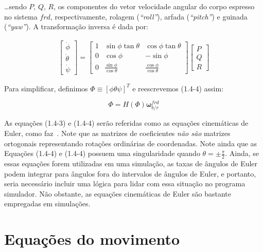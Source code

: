 \ldots sendo \(P\), \(Q\), \(R\), os componentes do vetor velocidade angular do corpo espresso no sistema \(frd\), respectivamente, rolagem (\emph{``roll''}), arfada (\emph{``pitch''}) e guinada (\emph{``yaw''}). A transformação inversa é dada por:

\begin{align} \tag{1.4-4}
    \begin{bmatrix}
        \dot\phi \\
        \dot\theta \\
        \dot\psi
    \end{bmatrix}
    =
    \begin{bmatrix}
        1 & \sin{\phi}\tan{\theta} & \cos{\phi}\tan{\theta} \\
        0 & \cos{\phi} & -\sin{\phi} \\
        0 & \frac{\sin{\phi}}{\cos{\theta}} & \frac{\cos{\phi}}{\cos{\theta}}
    \end{bmatrix}
    \begin{bmatrix}
        P \\ Q \\ R
    \end{bmatrix}
\end{align}

Para simplificar, definimos \(\Phi \equiv \left[\phi \theta \psi \right]^T \) e reescrevemos  (1.4-4) assim:

\begin{equation} \tag{1.4-5}
    \Phi = H \left( \Phi \right) \mathbf{\omega}^{frd}_{b/r}
\end{equation}

As equações (1.4-3) e (1.4-4) serão referidas como as equações cinemáticas de Euler, como faz~\cite{Stevens2016}. Note que as matrizes de coeficientes \emph{não são} matrizes ortogonais representando rotações ordinárias de coordenadas. Note ainda que as Equações (1.4-4) e (1.4-4) possuem uma singularidade quando  \(\theta = \pm \frac{\pi}{2}\). Ainda, se essas equações forem utilizadas em uma simulação, as taxas de ângulos de Euler podem integrar para ângulos fora do intervalos de ângulos de Euler, e portanto, seria necessário incluir uma lógica para lidar com essa situação no programa simulador. Não obstante, as equações cinemáticas de Euler são bastante empregadas em simulações.

\section{Equações do movimento}

